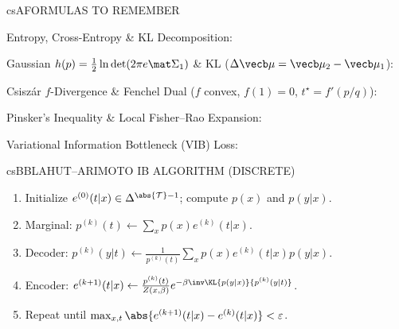\documentclass[../../../../master.tex]{subfiles}
\begin{document}
\begin{cscolumns}
\begin{cscard}{csA}{FORMULAS TO REMEMBER}
  \begin{csbul}
    \item Entropy, Cross-Entropy \& KL Decomposition:
    \item Gaussian $h(p)=\frac12\ln\det(2\pi e\mat\Sigma_1)$ \& KL ($\Delta\vecb\mu=\vecb\mu_2-\vecb\mu_1$):
    \item Csisz\'ar $f$-Divergence \& Fenchel Dual ($f$ convex, $f(1)=0$, $t^\star=f'(p/q)$):
    \item Pinsker's Inequality \& Local Fisher--Rao Expansion:
    \item Variational Information Bottleneck (VIB) Loss:
  \end{csbul}
\end{cscard}

\begin{cscard}{csB}{BLAHUT--ARIMOTO IB ALGORITHM (DISCRETE)}
  \begin{enumerate}[leftmargin=1.2em, itemsep=1pt, topsep=1pt, parsep=0pt]
    \item Initialize $e^{(0)}(t|x)\in\Delta^{\abs{\mathcal T}-1}$; compute $p(x)$ and $p(y|x)$.
    \item Marginal: $p^{(k)}(t)\leftarrow\sum_x p(x)e^{(k)}(t|x)$.
    \item Decoder: $p^{(k)}(y|t)\leftarrow\frac{1}{p^{(k)}(t)}\sum_x p(x)e^{(k)}(t|x)p(y|x)$.
    \item Encoder: $e^{(k+1)}(t|x)\leftarrow\frac{p^{(k)}(t)}{Z(x,\beta)}e^{-\beta\inv\KL{p(y|x)}{p^{(k)}(y|t)}}$.
    \item Repeat until $\max_{x,t}\abs{e^{(k+1)}(t|x)-e^{(k)}(t|x)}<\varepsilon$.
  \end{enumerate}
\end{cscard}
\columnbreak


\end{cscolumns}
\end{document}

